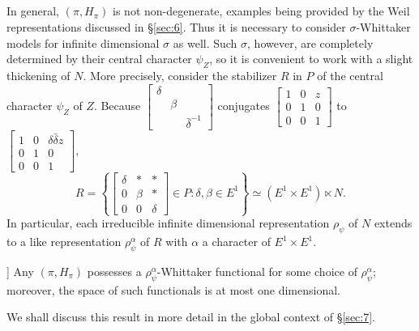 \subsection{}
\label{sec:1.6}
In general, $(\pi, H_\pi)$ is not non-degenerate, examples being provided by the Weil representations discussed in \S \ref{sec:6}.
Thus it is necessary to consider $\sigma$-Whittaker models for infinite dimensional $\sigma$ as well.
Such $\sigma$, however, are completely determined by their central character $\psi_Z$, so it is convenient to work with a slight thickening of $N$.
More precisely, consider the stabilizer $R$ in $P$ of the central character $\psi_Z$ of $Z$.
Because 
$\left[\begin{smallmatrix}
    \delta & & \\ & \beta & \\ & & \bar{\delta}^{-1}
\end{smallmatrix}\right]$
conjugates
$
\left[\begin{smallmatrix}
    1 & 0 & z \\ 0 & 1 & 0 \\ 0 & 0 & 1 
\end{smallmatrix}\right]
$
to
$
\left[\begin{smallmatrix}
    1 & 0 & \delta \bar{\delta}z \\ 0 & 1 & 0 \\ 0 & 0 & 1 
\end{smallmatrix}\right],
$
\[
R = \left\{ \begin{bmatrix} \delta & * & * \\ 0 & \beta & * \\ 0 & 0 & \delta\end{bmatrix} \in P: \delta, \beta \in E^1\right\} \simeq (E^1 \times E^1) \ltimes N.
\]
In particular, each irreducible infinite dimensional representation $\rho_\psi$ of $N$ extends to a like representation $\rho_\psi^\alpha$ of $R$ with $\alpha$ a character of $E^1 \times E^1$.

\begin{theorem*}[Existence and Uniqueness of Generalized Whittaker Models: [PS3]]
Any $(\pi, H_\pi)$ possesses a $\rho_\psi^\alpha$-Whittaker functional for some choice of $\rho_\psi^\alpha$; moreover, the space of such functionals is at most one dimensional.
\end{theorem*}

We shall discuss this result in more detail in the global context of \S \ref{sec:7}.